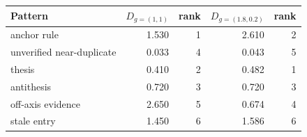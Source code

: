 \begin{tabular}{@{}lrrrr@{}}
\toprule
Pattern & $D_{g=(1,1)}$ & rank & $D_{g=(1.8,0.2)}$ & rank \\
\midrule
anchor rule & 1.530 & 1 & 2.610 & 2 \\
unverified near-duplicate & 0.033 & 4 & 0.043 & 5 \\
thesis & 0.410 & 2 & 0.482 & 1 \\
antithesis & 0.720 & 3 & 0.720 & 3 \\
off-axis evidence & 2.650 & 5 & 0.674 & 4 \\
stale entry & 1.450 & 6 & 1.586 & 6 \\
\bottomrule
\end{tabular}
